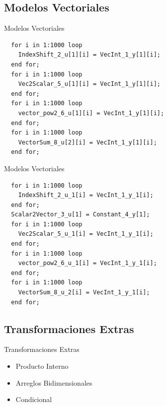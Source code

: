 \documentclass[10pt,presentation]{beamer}
\begin{document}
	\subsection{Modelos Vectoriales}

\begin{frame}[fragile]{Modelos Vectoriales}
\begin{verbatim}
  for i in 1:1000 loop
    IndexShift_2_u[1][i] = VecInt_1_y[1][i];
  end for;
  for i in 1:1000 loop
    Vec2Scalar_5_u[1][i] = VecInt_1_y[1][i];
  end for;
  for i in 1:1000 loop
    vector_pow2_6_u[1][i] = VecInt_1_y[1][i];
  end for;
  for i in 1:1000 loop
    VectorSum_8_u[2][i] = VecInt_1_y[1][i];
  end for;
\end{verbatim}
\end{frame}

\begin{frame}[fragile]{Modelos Vectoriales}
\begin{verbatim}
  for i in 1:1000 loop
    IndexShift_2_u_1[i] = VecInt_1_y_1[i];
  end for;
  Scalar2Vector_3_u[1] = Constant_4_y[1];
  for i in 1:1000 loop
    Vec2Scalar_5_u_1[i] = VecInt_1_y_1[i];
  end for;
  for i in 1:1000 loop
    vector_pow2_6_u_1[i] = VecInt_1_y_1[i];
  end for;
  for i in 1:1000 loop
    VectorSum_8_u_2[i] = VecInt_1_y_1[i];
  end for;
\end{verbatim}
\end{frame}


	\subsection{Transformaciones Extras}

\begin{frame}{Transformaciones Extras}
\begin{itemize}
	\item<1-> Producto Interno
	\item<2-> Arreglos Bidimensionales
	\item<3-> Condicional
\end{itemize}
\end{frame}
\end{document}
